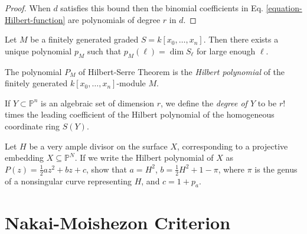 \begin{proof}
When $d$ satisfies this bound then the binomial coefficients in Eq.
\ref{equation-Hilbert-function} are polynomials of degree $r$ in $d$.
\end{proof}

\begin{theorem}
\label{theorem-Hilbert-Serre}
\begin{reference}
\cite[I, Theorem 7.5]{hart}
\end{reference}
Let $M$ be a finitely generated graded $S=k[x_0,\ldots,x_n]$. Then there exists
a unique polynomial $p_M$ such that $p_M(\ell)=\dim S_\ell$ for large enough
$\ell$.
\end{theorem}

\begin{definition}
\label{definition-Hilbert-polynomial}
\begin{reference}
\cite[I, p. 52]{har}
\end{reference}
The polynomial $P_M$ of Hilbert-Serre Theorem \cite{Hilbert-Serre} is the {\it
Hilbert polynomial} of the finitely generated $k[x_0,\ldots,x_n]$-module $M$.
\end{definition}

\begin{definition}
\label{definition-degree-of-projective-variety}
\begin{reference}
\cite[p. 52]{hart}
\end{reference}
If $Y\subset \mathbb{P}^n$ is an algebraic set of dimension $r$, we define the
{\it degree of $Y$} to be $r!$ times the leading coefficient of the Hilbert
polynomial of the homogeneous coordinate ring $S(Y)$.
\end{definition}

\begin{exercise}
\label{exercise-very-ample-bundle-self-intersection-is-degree-of-surface}
\begin{reference}
\cite[V, Exercise 1.2]{har}
\end{reference}
Let $H$ be a very ample divisor on the surface $X$, corresponding to a
projective embedding $X\subseteq\mathbb{P}^N$. If we write the Hilbert
polynomial of $X$ as $P(z)=\frac{1}{2}az^2+bz+c$, show that $a=H^2$,
$b=\frac{1}{2}H^2+1-\pi$, where $\pi$ is the genus of a nonsingular curve
representing $H$, and $c=1+p_a$.
\end{exercise}

\section{Nakai-Moishezon Criterion}
\label{section-Nakai-Moishezon-criterion}

